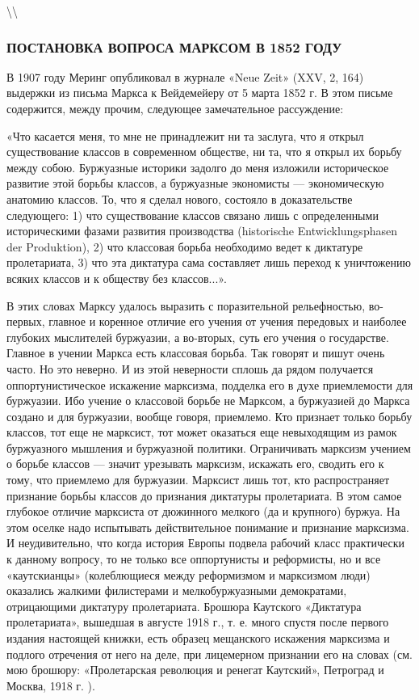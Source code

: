 \documentclass[12pt]{article}
\newcommand\ellipsis{%
  \textbackslash\thinspace\textellipsis\textbackslash
}
\newcommand{\parnum}{(\arabic{parcount})}
\newcounter{parcount}
\newcommand\p{%
    \stepcounter{parcount}%
    \noindent\marginpar[]{\parnum}%
}
\begin{document}
\ellipsis

\subsubsection*{ПОСТАНОВКА ВОПРОСА МАРКСОМ В 1852 ГОДУ}

\p В 1907 году Меринг опубликовал в журнале «Neue Zeit» (XXV, 2, 164) выдержки из письма Маркса к Вейдемейеру от 5 марта 1852 г. В этом письме содержится, между прочим, следующее замечательное рассуждение:

\p «Что касается меня, то мне не принадлежит ни та заслуга, что я открыл существование классов в современном обществе, ни та, что я открыл их борьбу между собою. Буржуазные историки задолго до меня изложили историческое развитие этой борьбы классов, а буржуазные экономисты — экономическую анатомию классов. То, что я сделал нового, состояло в доказательстве следующего: 1) что существование классов связано лишь с определенными историческими фазами развития производства (historische Entwicklungsphasen der Produktion), 2) что классовая борьба необходимо ведет к диктатуре пролетариата, 3) что эта диктатура сама составляет лишь переход к уничтожению всяких классов и к обществу без классов...».

\p В этих словах Марксу удалось выразить с поразительной рельефностью, во-первых, главное и коренное отличие его учения от учения передовых и наиболее глубоких мыслителей буржуазии, а во-вторых, суть его учения о государстве. Главное в учении Маркса есть классовая борьба. Так говорят и пишут очень часто. Но это неверно. И из этой неверности сплошь да рядом получается оппортунистическое искажение марксизма, подделка его в духе приемлемости для буржуазии. Ибо учение о классовой борьбе не Марксом, а буржуазией до Маркса создано и для буржуазии, вообще говоря, приемлемо. Кто признает только борьбу классов, тот еще не марксист, тот может оказаться еще невыходящим из рамок буржуазного мышления и буржуазной политики. Ограничивать марксизм учением о борьбе классов — значит урезывать марксизм, искажать его, сводить его к тому, что приемлемо для буржуазии. Марксист лишь тот, кто распространяет признание борьбы классов до признания диктатуры пролетариата. В этом самое глубокое отличие марксиста от дюжинного мелкого (да и крупного) буржуа. На этом оселке надо испытывать действительное понимание и признание марксизма. И неудивительно, что когда история Европы подвела рабочий класс практически к данному вопросу, то не только все оппортунисты и реформисты, но и все «каутскианцы» (колеблющиеся между реформизмом и марксизмом люди) оказались жалкими филистерами и мелкобуржуазными демократами, отрицающими диктатуру пролетариата. Брошюра Каутского «Диктатура пролетариата», вышедшая в августе 1918 г., т. е. много спустя после первого издания настоящей книжки, есть образец мещанского искажения марксизма и подлого отречения от него на деле, при лицемерном признании его на словах (см. мою брошюру: «Пролетарская революция и ренегат Каутский», Петроград и Москва, 1918 г. ).
\end{document}
